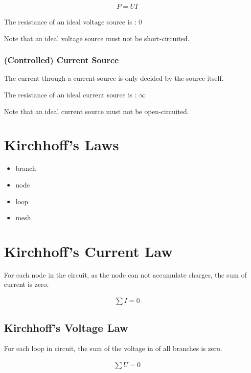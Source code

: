 \begin{equation*}
  \begin{aligned}
    P = U I
  \end{aligned}
\end{equation*}

The resistance of an ideal voltage source is : $0$

Note that an ideal voltage source must not be short-circuited.

\subsubsection{(Controlled) Current Source}

The current through a current source is only decided by the source itself.

The resistance of an ideal current source is : $\infty$

Note that an ideal current source must not be open-circuited.

\section{Kirchhoff's Laws}

\begin{itemize}
\item branch
\item node
\item loop
\item mesh
  
\end{itemize}

\section{Kirchhoff's Current Law}

For each node in the circuit, as the node can not accumulate charges, the sum of current is zero.

\begin{equation*}
  \begin{aligned}
    \sum I = 0
  \end{aligned}
\end{equation*}



\subsection{Kirchhoff's Voltage Law}

For each loop in circuit, the sum of the voltage in of all branches is zero.

\begin{equation*}
  \begin{aligned}
    \sum U = 0
  \end{aligned}
\end{equation*}


